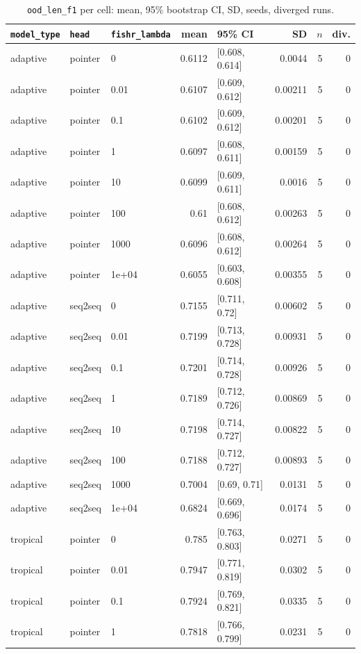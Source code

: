 \documentclass[10pt]{article}
\begin{document}
{\small
\begin{longtable}{lllrlrrr}
\caption{\texttt{ood\_len\_f1} per cell: mean, 95\% bootstrap CI, SD, seeds, diverged runs.}\label{tab:summary-ood_len_f1}\\
\toprule
\texttt{model\_type} & \texttt{head} & \texttt{fishr\_lambda} & mean & 95\% CI & SD & $n$ & div.\\
\midrule
\endhead
adaptive & pointer & 0 & 0.6112 & [0.608, 0.614] & 0.0044 & 5 & 0\\
adaptive & pointer & 0.01 & 0.6107 & [0.609, 0.612] & 0.00211 & 5 & 0\\
adaptive & pointer & 0.1 & 0.6102 & [0.609, 0.612] & 0.00201 & 5 & 0\\
adaptive & pointer & 1 & 0.6097 & [0.608, 0.611] & 0.00159 & 5 & 0\\
adaptive & pointer & 10 & 0.6099 & [0.609, 0.611] & 0.0016 & 5 & 0\\
adaptive & pointer & 100 & 0.61 & [0.608, 0.612] & 0.00263 & 5 & 0\\
adaptive & pointer & 1000 & 0.6096 & [0.608, 0.612] & 0.00264 & 5 & 0\\
adaptive & pointer & 1e+04 & 0.6055 & [0.603, 0.608] & 0.00355 & 5 & 0\\
adaptive & seq2seq & 0 & 0.7155 & [0.711, 0.72] & 0.00602 & 5 & 0\\
adaptive & seq2seq & 0.01 & 0.7199 & [0.713, 0.728] & 0.00931 & 5 & 0\\
adaptive & seq2seq & 0.1 & 0.7201 & [0.714, 0.728] & 0.00926 & 5 & 0\\
adaptive & seq2seq & 1 & 0.7189 & [0.712, 0.726] & 0.00869 & 5 & 0\\
adaptive & seq2seq & 10 & 0.7198 & [0.714, 0.727] & 0.00822 & 5 & 0\\
adaptive & seq2seq & 100 & 0.7188 & [0.712, 0.727] & 0.00893 & 5 & 0\\
adaptive & seq2seq & 1000 & 0.7004 & [0.69, 0.71] & 0.0131 & 5 & 0\\
adaptive & seq2seq & 1e+04 & 0.6824 & [0.669, 0.696] & 0.0174 & 5 & 0\\
tropical & pointer & 0 & 0.785 & [0.763, 0.803] & 0.0271 & 5 & 0\\
tropical & pointer & 0.01 & 0.7947 & [0.771, 0.819] & 0.0302 & 5 & 0\\
tropical & pointer & 0.1 & 0.7924 & [0.769, 0.821] & 0.0335 & 5 & 0\\
tropical & pointer & 1 & 0.7818 & [0.766, 0.799] & 0.0231 & 5 & 0\\

\end{longtable}}
\end{document}
